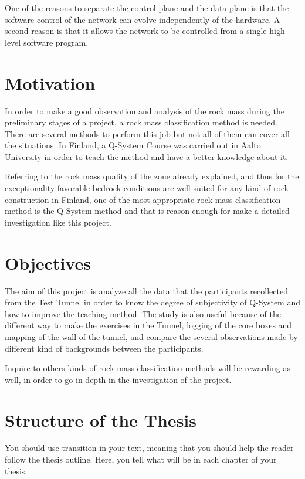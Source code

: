 One of the reasons to separate the control plane and the data plane is that the software control of the network can evolve independently of the hardware. A second reason is that it allows the network to be controlled from a single high-level software program.

\section{Motivation}

In order to make a good observation and analysis of the rock mass during the preliminary stages of a project, a rock mass classification method is needed. There are several methods to perform this job but not all of them can cover all the situations. In Finland, a Q-System Course was carried out in Aalto University in order to teach the method and have a better knowledge about it. 

Referring to the rock mass quality of the zone already explained, and thus for the exceptionality favorable bedrock conditions are well suited for any kind of rock construction in Finland, one of the most appropriate rock mass classification method is the Q-System method and that is reason enough for make a detailed investigation like this project.

\section{Objectives}

The aim of this project is analyze all the data that the participants recollected from the Test Tunnel in order to know the degree of subjectivity of Q-System and how to improve the teaching method. The study is also useful because of the different way to make the exercises in the Tunnel, logging of the core boxes and mapping of the wall of the tunnel, and compare the several observations made by different kind of backgrounds between the participants. 

Inquire to others kinds of rock mass classification methods will be rewarding as well, in order to go in depth in the investigation of the project.


\section{Structure of the Thesis}

You should use transition in your text, meaning that you should help
the reader follow the thesis outline. Here, you tell what will be in
each chapter of your thesis. 

